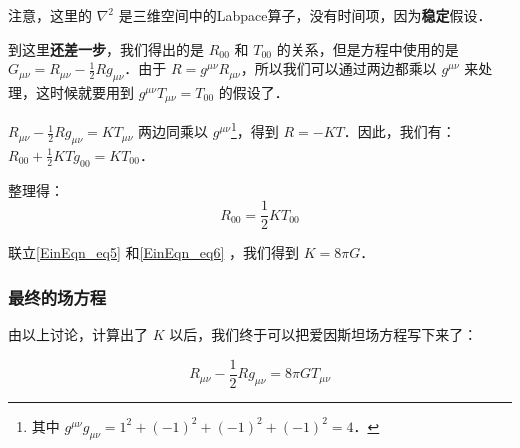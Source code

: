 注意，这里的 $\nabla^2$ 是三维空间中的Labpace算子，没有时间项，因为\textbf{稳定}假设．


到这里\textbf{还差一步}，我们得出的是 $R_{00}$ 和 $T_{00}$ 的关系，但是方程中使用的是 $G_{\mu\nu}=R_{\mu\nu}-\frac{1}{2}Rg_{\mu\nu}$．由于 $R=g^{\mu\nu}R_{\mu\nu}$，所以我们可以通过两边都乘以 $g^{\mu\nu}$ 来处理，这时候就要用到 $g^{\mu\nu}T_{\mu\nu}=T_{00}$ 的假设了．

$R_{\mu\nu}-\frac{1}{2}Rg_{\mu\nu}=KT_{\mu\nu}$ 两边同乘以 $g^{\mu\nu}$\footnote{其中 $g^{\mu\nu}g_{\mu\nu}=1^2+(-1)^2+(-1)^2+(-1)^2=4$．}，得到 $R=-KT$．因此，我们有：$R_{00}+\frac{1}{2}KTg_{00}=KT_{00}$．



整理得：
\begin{equation}\label{EinEqn_eq6}
R_{00}=\frac{1}{2}KT_{00}
\end{equation}

联立\autoref{EinEqn_eq5} 和\autoref{EinEqn_eq6} ，我们得到 $K=8\pi G$．

\subsubsection{最终的场方程}

由以上讨论，计算出了 $K$ 以后，我们终于可以把爱因斯坦场方程写下来了：

\begin{equation}\label{EinEqn_eq9}
R_{\mu\nu}-\frac{1}{2}Rg_{\mu\nu}=8\pi GT_{\mu\nu}
\end{equation}
















